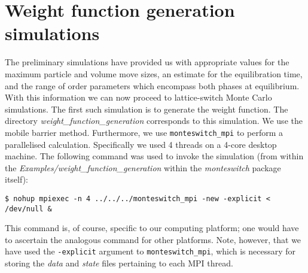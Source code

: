 \documentclass{report}
\begin{document}
\section{Weight function generation simulations}\label{sec:example_generation}
The preliminary simulations have provided us with appropriate values for the maximum particle and volume move sizes, an estimate for
the equilibration time, and the range of order parameters which encompass both phases at equilibrium. With this information we can
now proceed to lattice-switch Monte Carlo simulations. The first such simulation is to generate the weight function. The directory
\emph{weight\_function\_generation} corresponds to this simulation. We use the mobile barrier method. Furthermore, we use \texttt{monteswitch\_mpi}
to perform a parallelised calculation. Specifically we used 4 threads on a 4-core desktop machine. The following command was used
to invoke the simulation (from within the \emph{Examples/weight\_function\_generation} within the \emph{monteswitch} package itself):
\begin{verbatim}
$ nohup mpiexec -n 4 ../../../monteswitch_mpi -new -explicit < 
/dev/null &
\end{verbatim}
This command is, of course, specific to our computing platform; one would have to ascertain the analogous command for other platforms. Note, however,
that we have used the \texttt{-explicit} argument to \texttt{monteswitch\_mpi}, which is necessary for storing the \emph{data} and \emph{state} 
files pertaining to each MPI thread.
\end{document}
